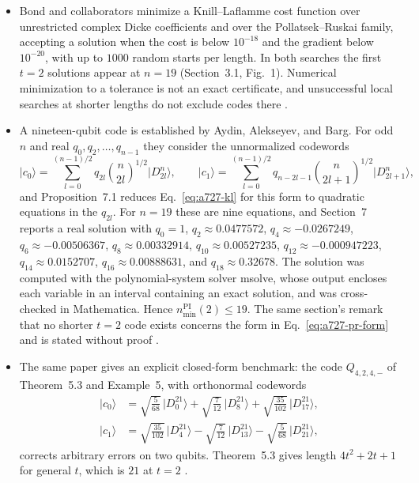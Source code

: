\begin{itemize}
  \item Bond and collaborators minimize a Knill--Laflamme cost function over
  unrestricted complex Dicke coefficients and over the Pollatsek--Ruskai family,
  accepting a solution when the cost is below $10^{-18}$ and the gradient below
  $10^{-20}$, with up to $1000$ random starts per length.  In both searches the
  first $t=2$ solutions appear at $n=19$ (Section~3.1, Fig.~1).  Numerical
  minimization to a tolerance is not an exact certificate, and unsuccessful
  local searches at shorter lengths do not exclude codes there
  .

  \item A nineteen-qubit code is established by Aydin, Alekseyev, and Barg.  For odd
  $n$ and real $q_0,q_2,\dots,q_{n-1}$ they consider the unnormalized codewords
  \begin{equation}
    \lvert c_0\rangle=\sum_{l=0}^{(n-1)/2}q_{2l}\binom{n}{2l}^{1/2}\lvert D_{2l}^n\rangle,
    \qquad
    \lvert c_1\rangle=\sum_{l=0}^{(n-1)/2}q_{n-2l-1}\binom{n}{2l+1}^{1/2}\lvert D_{2l+1}^n\rangle,
    \label{eq:a727-pr-form}
  \end{equation}
  and Proposition~7.1 reduces Eq.~\eqref{eq:a727-kl} for this form to
  quadratic equations in the $q_{2l}$.  For $n=19$ these are nine equations,
  and Section~7 reports a real solution with $q_0=1$, $q_2\approx0.0477572$,
  $q_4\approx-0.0267249$, $q_6\approx-0.00506367$, $q_8\approx0.00332914$,
  $q_{10}\approx0.00527235$, $q_{12}\approx-0.000947223$,
  $q_{14}\approx0.0152707$, $q_{16}\approx0.00888631$, and
  $q_{18}\approx0.32678$.  The solution was computed with the polynomial-system
  solver msolve, whose output encloses each variable in an interval containing
  an exact solution, and was cross-checked in Mathematica.  Hence
  $n_{\min}^{\mathrm{PI}}(2)\leq19$.  The same section's remark that no shorter
  $t=2$ code exists concerns the form in Eq.~\eqref{eq:a727-pr-form} and is
  stated without proof .

  \item The same paper gives an explicit closed-form benchmark: the code
  $Q_{4,2,4,-}$ of Theorem~5.3 and Example~5, with orthonormal codewords
  \begin{equation}
    \begin{aligned}
      \lvert c_0\rangle&=\sqrt{\tfrac{5}{68}}\,\lvert D_0^{21}\rangle
        +\sqrt{\tfrac{7}{12}}\,\lvert D_8^{21}\rangle
        +\sqrt{\tfrac{35}{102}}\,\lvert D_{17}^{21}\rangle,\\
      \lvert c_1\rangle&=\sqrt{\tfrac{35}{102}}\,\lvert D_4^{21}\rangle
        -\sqrt{\tfrac{7}{12}}\,\lvert D_{13}^{21}\rangle
        -\sqrt{\tfrac{5}{68}}\,\lvert D_{21}^{21}\rangle,
    \end{aligned}
    \label{eq:a727-21-qubit}
  \end{equation}
  corrects arbitrary errors on two qubits.  Theorem~5.3 gives length
  $4t^2+2t+1$ for general $t$, which is $21$ at $t=2$
  .


\end{itemize}
